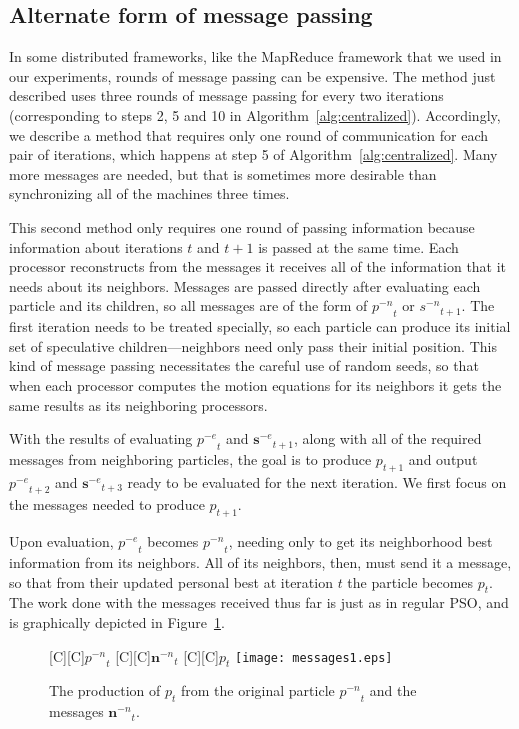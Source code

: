 \documentclass[oneside,honors]{honors}
\newcommand{\fig}[1]{Figure~\ref{fig:#1}}
\newcommand{\alg}[1]{Algorithm~\ref{alg:#1}}
\providecommand{\noeval}[1]{\ensuremath{#1^{-e}}}
\providecommand{\nonbest}[1]{\ensuremath{#1^{-n}}}
\providecommand{\p}{\ensuremath{p}}
\providecommand{\s}{\ensuremath{s}}
\providecommand{\sset}{\ensuremath{\mathbf{s}}}
\providecommand{\nset}{\ensuremath{\mathbf{n}}}
\begin{document}
\subsection{Alternate form of message passing}

In some distributed frameworks, like the MapReduce framework that we used in
our experiments, rounds of message passing can be expensive.  The method just
described uses three rounds of message passing for every two iterations
(corresponding to steps 2, 5 and 10 in \alg{centralized}).  Accordingly, we
describe a method that requires only one round of communication for each pair
of iterations, which happens at step 5 of \alg{centralized}.  Many more
messages are needed, but that is sometimes more desirable than synchronizing
all of the machines three times.

This second method only requires one round of passing information because
information about iterations $t$ and $t+1$ is passed at the same time.  Each
processor reconstructs from the messages it receives all of the information
that it needs about its neighbors.  Messages are passed directly after
evaluating each particle and its children, so all messages are of the form of
$\nonbest{\p}_t$ or $\nonbest{\s}_{t+1}$.  The first iteration needs to be
treated specially, so each particle can produce its initial set of speculative
children---neighbors need only pass their initial position.  This kind of
message passing necessitates the careful use of random seeds, so that when each
processor computes the motion equations for its neighbors it gets the same
results as its neighboring processors.

With the results of evaluating $\noeval{\p}_t$ and $\noeval{\sset}_{t+1}$,
along with all of the required messages from neighboring particles, the goal is
to produce $\p_{t+1}$ and output $\noeval{\p}_{t+2}$ and $\noeval{\sset}_{t+3}$
ready to be evaluated for the next iteration.  We first focus on the messages
needed to produce $\p_{t+1}$.

Upon evaluation, $\noeval{\p}_t$ becomes $\nonbest{\p}_t$, needing only to get
its neighborhood best information from its neighbors.  All of its neighbors,
then, must send it a message, so that from their updated personal best at
iteration $t$ the particle becomes $\p_t$.  The work done with the messages
received thus far is just as in regular PSO, and is graphically depicted in 
\fig{messages1}.

\begin{figure}
  \centering
  [C][C]{$\nonbest{\p}_{t}$}
  [C][C]{$\nonbest{\nset}_{t}$}
  [C][C]{$\p_{t}$}
  \texttt{[image: messages1.eps]}
  \caption{The production of $\p_{t}$ from the original particle
  $\nonbest{\p}_{t}$ and the messages $\nonbest{\nset}_{t}$.}
  \label{fig:messages1}
\end{figure}
\end{document}

